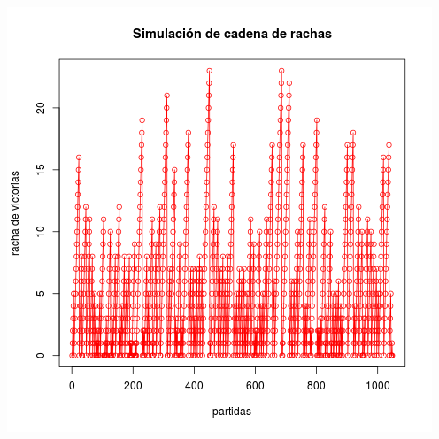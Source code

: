 \documentclass[paper=letter, fontsize=12pt]{scrartcl} %
\numberwithin{equation}{section} %
\numberwithin{figure}{section} %
\numberwithin{table}{section} %
\begin{document}
\begin{center}
  \includegraphics[scale=0.5]{ej6_1.png}
\end{center}
\end{document}
